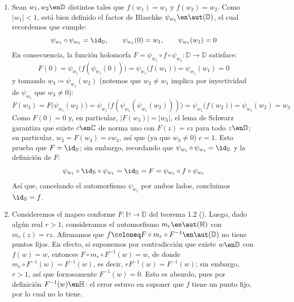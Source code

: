 \begin{sol}
\begin{enumerate}[label=(\alph*),leftmargin=1.5em]
\item 
Sean $w_1,w_2\en\mathbb{D}$ distintos tales que $f(w_1)=w_1$ y $f(w_2) = w_2$. Como $|w_1| < 1$, está bien definido el factor de Blaschke $\psi_{w_1} \en \aut(\mathbb{D})$, el cual recordemos que cumple:
\[
\psi_{w_1} \circ \psi_{w_1} = \id_{\mathbb{D}},
\qquad \psi_{w_1}(0)=w_1,
\qquad \psi_{w_1}(w_1) = 0
\]
En consecuencia, la función holomorfa $F= \psi_{w_1} \circ f \circ \psi_{w_1} \colon \mathbb{D} \to \mathbb{D}$ satisface:
\[
F(0) = \psi_{w_1}\bigl(f(\psi_{w_1}(0))\bigr) = \psi_{w_1}\bigl(f(w_1)\bigr) = \psi_{w_1}(w_1) = 0
\]
y tomando $w_3 \coloneq \psi_{w_1}(w_2)$ (notemos que $w_2\neq w_1$ implica por inyectividad de $\psi_{w_1}$ que $w_3 \neq 0$):
\[
F(w_3) = F\bigl(\psi_{w_1}(w_2)\bigr) = \psi_{w_1}\bigl(f(\psi_{w_1}(\psi_{w_1}(w_2)))\bigr) = \psi_{w_1}\bigl(f(w_2)\bigr) = \psi_{w_1}(w_2) = w_3
\]
Como $F(0) = 0$ y, en particular, $|F(w_3)| = |w_3|$, el lema de Schwarz garantiza que existe $c\en\mathbb{C}$ de norma uno con $F(z) = cz$ para todo $z\en\mathbb{D}$; en particular, $w_3 = F(w_3) = cw_3$, así que (ya que $w_3\neq 0$) $c=1$. Esto prueba que $F = \id_{\mathbb{D}}$; sin embargo, recordando que $\psi_{w_1} \circ \psi_{w_1} = \id_{\mathbb{D}}$ y la definición de $F$:
\[
\psi_{w_1} \circ {\id_{\mathbb{D}}} \circ \psi_{w_1} = \id_{\mathbb{D}} = F = \psi_{w_1} \circ f \circ \psi_{w_1}
\]
Así que, cancelando el automorfismo $\psi_{w_1}$ por ambos lados, concluimos $\id_{\mathbb{D}} = f$.

\item 
Consideremos el mapeo conforme $F \colon \mathbb{H} \to \mathbb{D}$ del teorema 1.2 (\cite[\S 8.1]{stein}). Luego, dado algún real $r>1$, consideramos el automorfismo $m_r \en \aut(\mathbb{H})$ con $m_r(z) = rz$. Afirmamos que $f \coloneq F \circ m_r\circ F^{-1} \en\aut(\mathbb{D})$ no tiene puntos fijos. En efecto, si suponemos por contradicción que existe $w\en\mathbb{D}$ con $f(w) = w$, entonces $F \circ m_r\circ F^{-1}(w) = w$, de donde $m_r\circ F^{-1}(w) = F^{-1}(w)$, es decir, $rF^{-1}(w) = F^{-1}(w)$; sin embargo, $r >1$, así que forzosamente $F^{-1}(w)=0$. Esto es absurdo, pues por definición $F^{-1}(w)\en\mathbb{H}$: el error estuvo en suponer que $f$ tiene un punto fijo, por lo cual no lo tiene. 
\end{enumerate}
\end{sol}
